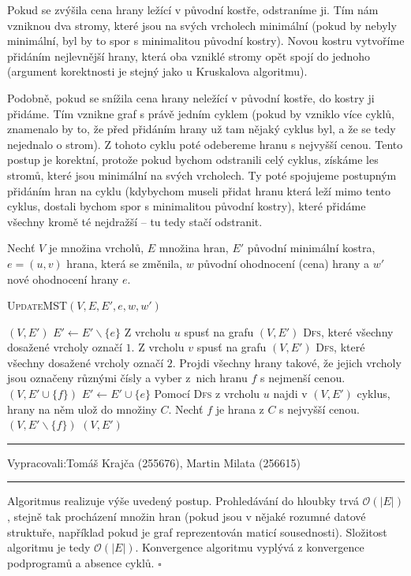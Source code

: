 \documentclass[12pt]{article}
\newcommand{\la}{\leftarrow}
\renewcommand{\O}{\mathcal{O}}
\newcommand{\zadani}[2]{
{\large
\noindent {\bf IB108 \hfill{} Sada #1, Příklad #2 \\[-4mm]}
\noindent\hrule
\vspace{2mm}
\noindent Vypracovali:\hfill{}Tomáš Krajča (255676), Martin Milata (256615)
\vspace{3mm}
\hrule
\bigskip\bigskip}
}
\begin{document}
Pokud se zvýšila cena hrany ležící v původní kostře, odstraníme ji. Tím nám vzniknou dva stromy,
které jsou na svých vrcholech minimální
(pokud by nebyly minimální, byl by to spor s minimalitou původní kostry). Novou kostru
vytvoříme přidáním nejlevnější hrany, která oba vzniklé stromy opět spojí do jednoho (argument
korektnosti je stejný jako u Kruskalova algoritmu).

Podobně, pokud se snížila cena hrany neležící v původní kostře, do kostry ji přidáme. Tím vznikne graf
s právě jedním cyklem (pokud by vzniklo více cyklů, znamenalo by to, že před přidáním hrany už tam nějaký
cyklus byl, a že se tedy nejednalo o strom). Z tohoto cyklu poté odebereme hranu s nejvyšší cenou. Tento
postup je korektní, protože pokud bychom odstranili celý cyklus, získáme les stromů, které jsou
minimální na svých vrcholech.
Ty poté spojujeme postupným přidáním hran na cyklu (kdybychom museli přidat hranu která leží mimo
tento cyklus, dostali bychom spor s minimalitou původní kostry), které přidáme všechny kromě té nejdražší
-- tu tedy stačí odstranit.

Nechť $V$ je množina vrcholů, $E$ množina hran, $E'$ původní minimální kostra, $e=(u,v)$ hrana, která
se změnila, $w$ původní ohodnocení (cena) hrany a $w'$ nové ohodnocení hrany $e$.

\begin{algorithm}
\textsc{UpdateMST}$(V, E, E', e, w, w')$
\begin{algorithmic}[1]
	\RETURN $(V,E')$
	\STATE $E' \la E' \smallsetminus \{e\}$
	\STATE Z vrcholu $u$ spusť na grafu $(V,E')$ \textsc{Dfs}, které všechny dosažené vrcholy označí $1$.
	\STATE Z vrcholu $v$ spusť na grafu $(V,E')$ \textsc{Dfs}, které všechny dosažené vrcholy označí $2$.
	\STATE Projdi všechny hrany takové, že jejich vrcholy jsou označeny různými čísly a vyber z~nich hranu $f$ s nejmenší cenou.
	\RETURN $(V,E' \cup \{f\})$
	\STATE $E' \la E' \cup \{e\}$
	\STATE Pomocí \textsc{Dfs} z vrcholu $u$ najdi v $(V,E')$ cyklus, hrany na něm ulož do množiny $C$.
	\STATE Nechť $f$ je hrana z $C$ s nejvyšší cenou.
	\RETURN $(V,E' \smallsetminus \{f\})$
	\RETURN $(V,E')$
\ENDIF
\end{algorithmic}
\end{algorithm}

\clearpage
\zadani{3}{4}
\noindent
Algoritmus realizuje výše uvedený postup. Prohledávání do hloubky trvá $\O(|E|)$, stejně tak procházení množin hran
(pokud jsou v nějaké rozumné datové struktuře, například pokud je graf reprezentován maticí sousednosti). Složitost
algoritmu je tedy $\O(|E|)$. Konvergence algoritmu vyplývá z konvergence podprogramů a absence
cyklů. \hfill$\square$
\end{document}
